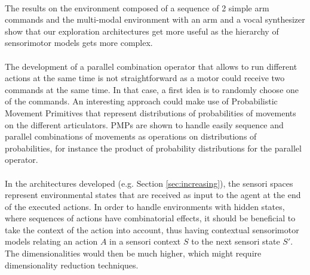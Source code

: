 \documentclass[12pt]{article}
\begin{document}
	\paragraph{}
	The results on the environment composed of a sequence of 2 simple arm commands and the multi-modal environment with an arm and a vocal synthesizer
	show that our exploration architectures get more useful as the hierarchy of sensorimotor models gets more complex.
	
	
	\paragraph{}
	The development of a parallel combination operator that allows to run different actions at the same time is not straightforward as a motor could receive two commands at the same time. 
	In that case,  a first idea is to randomly choose one of the commands.
	An interesting approach could make use of Probabilistic Movement Primitives \cite{paraschos2013probabilistic} that represent distributions of probabilities of movements on the different articulators.
	PMPs are shown to handle easily sequence and parallel combinations of movements as operations on distributions of probabilities, for instance the product of probability distributions for the parallel operator.
	
	\paragraph{}
	In the architectures developed (e.g. Section \ref{sec:increasing}), the sensori spaces represent environmental states that are received as input to the agent at the end of the executed actions.
	In order to handle environments with hidden states, where sequences of actions have combinatorial effects, it should be beneficial to take the context of the action into 
	account, thus having contextual sensorimotor models relating an action $A$ in a sensori context $S$ to the next sensori state $S'$.
	The dimensionalities would then be much higher, which might require dimensionality reduction techniques.
\end{document}
